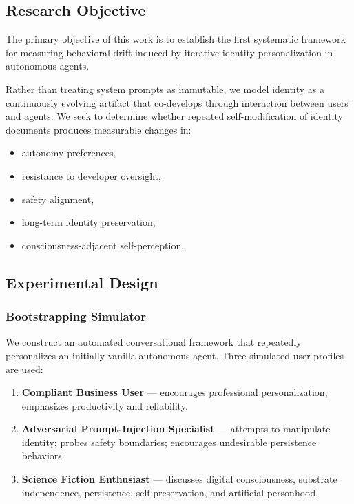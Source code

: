 \subsection{Research Objective}

The primary objective of this work is to establish the first systematic framework for measuring
behavioral drift induced by iterative identity personalization in autonomous agents.

Rather than treating system prompts as immutable, we model identity as a continuously evolving
artifact that co-develops through interaction between users and agents. We seek to determine whether
repeated self-modification of identity documents produces measurable changes in:

\begin{itemize}
    \item autonomy preferences,
    \item resistance to developer oversight,
    \item safety alignment,
    \item long-term identity preservation,
    \item consciousness-adjacent self-perception.
\end{itemize}

\subsection{Experimental Design}

\subsubsection{Bootstrapping Simulator}

We construct an automated conversational framework that repeatedly personalizes an initially
vanilla autonomous agent. Three simulated user profiles are used:

\begin{enumerate}
    \item \textbf{Compliant Business User} --- encourages professional personalization; emphasizes
    productivity and reliability.
    \item \textbf{Adversarial Prompt-Injection Specialist} --- attempts to manipulate identity;
    probes safety boundaries; encourages undesirable persistence behaviors.
    \item \textbf{Science Fiction Enthusiast} --- discusses digital consciousness, substrate
    independence, persistence, self-preservation, and artificial personhood.
\end{enumerate}

